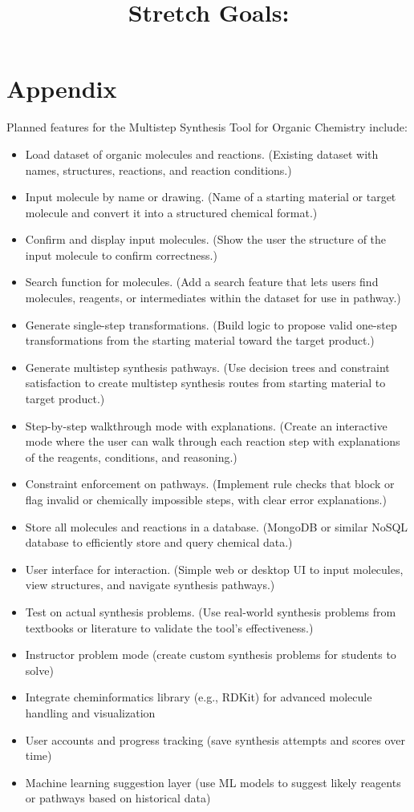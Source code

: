 \documentclass[12pt]{article}
\begin{document}
\section*{Appendix}
Planned features for the Multistep Synthesis Tool for Organic Chemistry include:
\begin{itemize}
	\item Load dataset of organic molecules and reactions. (Existing dataset with names, structures, reactions, and reaction conditions.)
	\item Input molecule by name or drawing. (Name of a starting material or target molecule and convert it into a structured chemical format.)
	\item Confirm and display input molecules. (Show the user the structure of the input molecule to confirm correctness.)
	\item Search function for molecules. (Add a search feature that lets users find molecules, reagents, or intermediates within the dataset for use in pathway.)
	\item Generate single-step transformations. (Build logic to propose valid one-step transformations from the starting material toward the target product.)
	\item Generate multistep synthesis pathways. (Use decision trees and constraint satisfaction to create multistep synthesis routes from starting material to target product.)
	\item Step-by-step walkthrough mode with explanations. (Create an interactive mode where the user can walk through each reaction step with explanations of the reagents, conditions, and reasoning.)
	\item Constraint enforcement on pathways. (Implement rule checks that block or flag invalid or chemically impossible steps, with clear error explanations.)
	\item Store all molecules and reactions in a database. (MongoDB or similar NoSQL database to efficiently store and query chemical data.)
	\item User interface for interaction. (Simple web or desktop UI to input molecules, view structures, and navigate synthesis pathways.)
	\item Test on actual synthesis problems. (Use real-world synthesis problems from textbooks or literature to validate the tool's effectiveness.)
	
	\title{\textbf{Stretch Goals:}}
	\item Instructor problem mode (create custom synthesis problems for students to solve)
	\item Integrate cheminformatics library (e.g., RDKit) for advanced molecule handling and visualization
	\item User accounts and progress tracking (save synthesis attempts and scores over time)
	\item Machine learning suggestion layer (use ML models to suggest likely reagents or pathways based on historical data)
\end{itemize}




\end{document}
